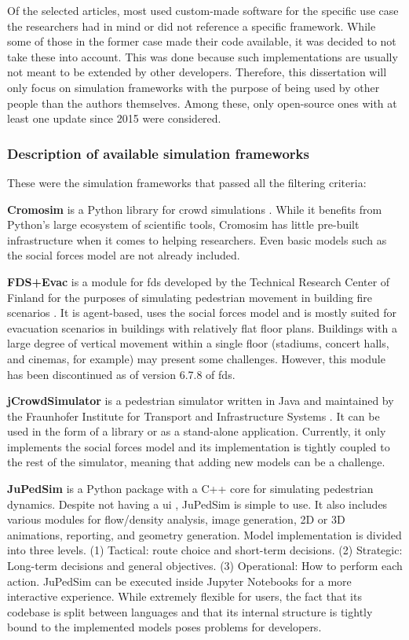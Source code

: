 \documentclass[twoside, 11pt]{article}
\begin{document}
Of the selected articles, most used custom-made software for the specific use case the researchers had in mind or did not reference a specific framework. While some of those in the former case made their code available, it was decided to not take these into account. This was done because such implementations are usually not meant to be extended by other developers. Therefore, this dissertation will only focus on simulation frameworks with the purpose of being used by other people than the authors themselves. Among these, only open-source ones with at least one update since 2015 were considered. 

\subsubsection{Description of available simulation frameworks}

These were the simulation frameworks that passed all the filtering criteria:

\textbf{Cromosim} is a Python library for crowd simulations \cite{cromosim}. While it benefits from Python's large ecosystem of scientific tools, Cromosim has little pre-built infrastructure when it comes to helping researchers. Even basic models such as the social forces model are not already included.

\textbf{FDS+Evac} is a module for \gls{fds} developed by the Technical Research Center of Finland for the purposes of simulating pedestrian movement in building fire scenarios \cite{korhonenFireDynamicsSimulator2009}. It is agent-based, uses the social forces model and is mostly suited for evacuation scenarios in buildings with relatively flat floor plans. Buildings with a large degree of vertical movement within a single floor (stadiums, concert halls, and cinemas, for example) may present some challenges. However, this module has been discontinued as of version 6.7.8 of \gls{fds}.

\textbf{jCrowdSimulator} is a pedestrian simulator written in Java and maintained by the Fraunhofer Institute for Transport and Infrastructure Systems \cite{meinert2019simulation}. It can be used in the form of a library or as a stand-alone application. Currently, it only implements the social forces model and its implementation is tightly coupled to the rest of the simulator, meaning that adding new models can be a challenge.

\textbf{JuPedSim} is a Python package with a C++ core for simulating pedestrian dynamics. Despite not having a \gls{ui} \cite{kemlohwagoumJuPedSimOpenFramework2015}, JuPedSim is simple to use. It also includes various modules for flow/density analysis, image generation, 2D or 3D animations, reporting, and geometry generation. Model implementation is divided into three levels. (1) Tactical: route choice and short-term decisions. (2) Strategic: Long-term decisions and general objectives. (3) Operational: How to perform each action. JuPedSim can be executed inside Jupyter Notebooks for a more interactive experience. While extremely flexible for users, the fact that its codebase is split between languages and that its internal structure is tightly bound to the implemented models poses problems for developers.
\end{document}
